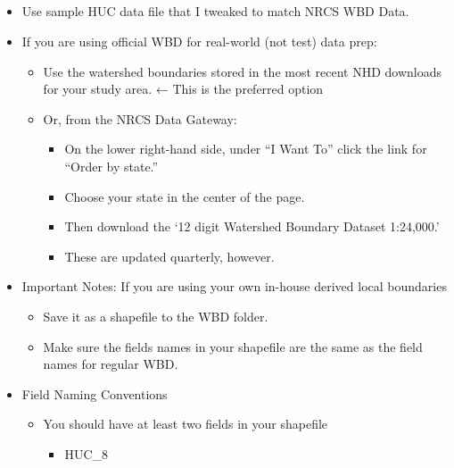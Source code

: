 \documentclass[letterpaper,10pt,english]{sphinxmanual}
\begin{document}
\subparagraph{}
\label{\detokenize{ex_1:wbd}}
\begin{itemize}
\item {} 
Use sample HUC data file that I tweaked to match NRCS WBD Data.

\end{itemize}

\begin{itemize}
\item {} 
If you are using official WBD for real-world (not test) data prep:
\begin{itemize}
\item {} 
Use the watershed boundaries stored in the most recent NHD downloads for your study area. ← This is the preferred option

\item {} 
Or, from the NRCS Data Gateway: 
\begin{itemize}
\item {} 
On the lower right-hand side, under “I Want To” click the link for “Order by state.”

\item {} 
Choose your state in the center of the page.

\item {} 
Then download the ‘12 digit Watershed Boundary Dataset 1:24,000.’

\item {} 
These are updated quarterly, however.

\end{itemize}

\end{itemize}

\item {} 
Important Notes: If you are using your own in-house derived local boundaries
\begin{itemize}
\item {} 
Save it as a shapefile to the WBD folder.

\item {} 
Make sure the fields names in your shapefile are the same as the field names for regular WBD.

\end{itemize}

\item {} 
Field Naming Conventions
\begin{itemize}
\item {} 
You should have at least two fields in your shapefile
\begin{itemize}
\item {} 
HUC\_8


\end{itemize}
\end{itemize}
\end{itemize}
\end{document}

